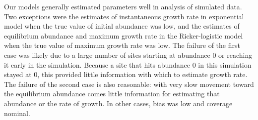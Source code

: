 \documentclass[12pt,english]{article}
\begin{document}
\begin{spacing}{1.9}
\begin{flushleft}
Our models generally estimated parameters well in analysis of simulated data.
Two exceptions were the estimates of instantaneous growth rate in exponential model when the 
true value of initial abundance was low, and the estimates of equilibrium abundance and maximum
growth rate in the Ricker-logistic model when the true value of maximum growth rate was low.  
The failure of the first case was likely due to a large number of sites starting at abundance 0 or reaching it early in the simulation.  
Because a site that hits abundance 0 in this simulation stayed at 0, this provided little information with
which to estimate growth rate.  The failure of the second case is also reasonable: with very
slow movement toward the equilibrium abundance comes little information for estimating
that abundance or the rate of growth.  In other cases, bias was low and coverage nominal.

\end{flushleft}
\end{spacing}
\end{document}
